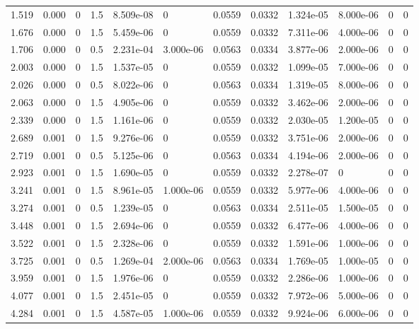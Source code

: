 \documentclass[preview]{standalone}
\begin{document}
{{\begin{tabular}{L{1.2cm}C{1.2cm} C{0.3cm}C{0.5cm} C{1.4cm}C{1.4cm} C{1.4cm}C{1.4cm} C{1.6cm}C{1.6cm} C{1.6cm}C{1.6cm}}
  1.519  &  0.000  & 0     & 1.5 &  8.509e-08  & 0  &  0.0559&   0.0332& 1.324e-05 & 8.000e-06   &  0 & 0  \\ 
  1.676  &  0.000  & 0     & 1.5 &  5.459e-06  & 0  &  0.0559&   0.0332& 7.311e-06 & 4.000e-06   &  0 & 0  \\ 
  1.706  &  0.000  & 0     & 0.5 &  2.231e-04  & 3.000e-06  &  0.0563&   0.0334& 3.877e-06 & 2.000e-06   &  0 & 0  \\ 
  2.003  &  0.000  & 0     & 1.5 &  1.537e-05  & 0  &  0.0559&   0.0332& 1.099e-05 & 7.000e-06   &  0 & 0  \\ 
  2.026  &  0.000  & 0     & 0.5 &  8.022e-06  & 0  &  0.0563&   0.0334& 1.319e-05 & 8.000e-06   &  0 & 0  \\ 
  2.063  &  0.000  & 0     & 1.5 &  4.905e-06  & 0  &  0.0559&   0.0332& 3.462e-06 & 2.000e-06   &  0 & 0  \\ 
  2.339  &  0.000  & 0     & 1.5 &  1.161e-06  & 0  &  0.0559&   0.0332& 2.030e-05 & 1.200e-05   &  0 & 0  \\ 
  2.689  &  0.001  & 0     & 1.5 &  9.276e-06  & 0  &  0.0559&   0.0332& 3.751e-06 & 2.000e-06   &  0 & 0  \\ 
  2.719  &  0.001  & 0     & 0.5 &  5.125e-06  & 0  &  0.0563&   0.0334& 4.194e-06 & 2.000e-06   &  0 & 0  \\ 
  2.923  &  0.001  & 0     & 1.5 &  1.690e-05  & 0  &  0.0559&   0.0332& 2.278e-07 & 0   &  0 & 0  \\ 
  3.241  &  0.001  & 0     & 1.5 &  8.961e-05  & 1.000e-06  &  0.0559&   0.0332& 5.977e-06 & 4.000e-06   &  0 & 0  \\ 
  3.274  &  0.001  & 0     & 0.5 &  1.239e-05  & 0  &  0.0563&   0.0334& 2.511e-05 & 1.500e-05   &  0 & 0  \\ 
  3.448  &  0.001  & 0     & 1.5 &  2.694e-06  & 0  &  0.0559&   0.0332& 6.477e-06 & 4.000e-06   &  0 & 0  \\ 
  3.522  &  0.001  & 0     & 1.5 &  2.328e-06  & 0  &  0.0559&   0.0332& 1.591e-06 & 1.000e-06   &  0 & 0  \\ 
  3.725  &  0.001  & 0     & 0.5 &  1.269e-04  & 2.000e-06  &  0.0563&   0.0334& 1.769e-05 & 1.000e-05   &  0 & 0  \\ 
  3.959  &  0.001  & 0     & 1.5 &  1.976e-06  & 0  &  0.0559&   0.0332& 2.286e-06 & 1.000e-06   &  0 & 0  \\ 
  4.077  &  0.001  & 0     & 1.5 &  2.451e-05  & 0  &  0.0559&   0.0332& 7.972e-06 & 5.000e-06   &  0 & 0  \\ 
  4.284  &  0.001  & 0     & 1.5 &  4.587e-05  & 1.000e-06  &  0.0559&   0.0332& 9.924e-06 & 6.000e-06   &  0 & 0  \\ 

\end{tabular}}}
\end{document}
